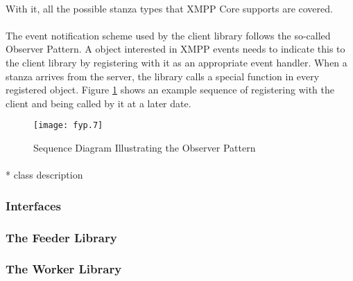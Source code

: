 \paragraph{}
With it, all the possible stanza types that XMPP Core supports are covered.

\paragraph{}
The event notification scheme used by the client library follows the so-called Observer Pattern. A object interested in XMPP events needs to indicate this to the client library by registering with it as an appropriate event handler. When a stanza arrives from the server, the library calls a special function in every registered object. Figure \ref{fig:observer1} shows an example sequence of registering with the client and being called by it at a later date.

\begin{figure}[H]
\begin{flushleft}
\texttt{[image: fyp.7]}
\end{flushleft}
\caption{Sequence Diagram Illustrating the Observer Pattern}
\label{fig:observer1}
\end{figure}

\paragraph{}
* class description

\subsubsection{Interfaces}
\paragraph{}

\subsubsection{The Feeder Library}
\paragraph{}

\subsubsection{The Worker Library}
\paragraph{}


